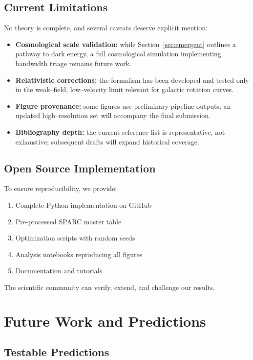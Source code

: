 \documentclass[twocolumn,prd,amsmath,amssymb,aps,superscriptaddress,nofootinbib]{revtex4-2}
\begin{document}
\subsection{Current Limitations}

No theory is complete, and several caveats deserve explicit mention:
\begin{itemize}
  \item \textbf{Cosmological scale validation:} while Section~\ref{sec:emergent} outlines a pathway to dark energy, a full cosmological simulation implementing bandwidth triage remains future work.
  \item \textbf{Relativistic corrections:} the formalism has been developed and tested only in the weak--field, low--velocity limit relevant for galactic rotation curves.
  \item \textbf{Figure provenance:} some figures use preliminary pipeline outputs; an updated high--resolution set will accompany the final submission.
  \item \textbf{Bibliography depth:} the current reference list is representative, not exhaustive; subsequent drafts will expand historical coverage.
\end{itemize}

\subsection{Open Source Implementation}

To ensure reproducibility, we provide:
\begin{enumerate}
\item Complete Python implementation on GitHub
\item Pre-processed SPARC master table
\item Optimization scripts with random seeds
\item Analysis notebooks reproducing all figures
\item Documentation and tutorials
\end{enumerate}

The scientific community can verify, extend, and challenge our results.

\section{Future Work and Predictions}
\label{sec:future}

\subsection{Testable Predictions}
\end{document}
